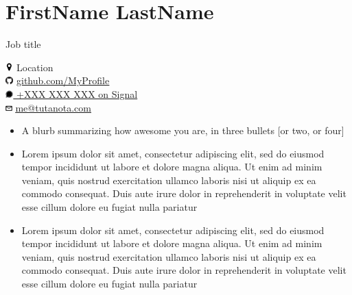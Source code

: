 \documentclass[12pt]{article}
\begin{document}
%
%
%
%
\noindent
\begin{minipage}[t]{0.66\textwidth}
\section*{\LARGE FirstName LastName}
\begin{LARGE}
Job title\\
\end{LARGE}
\end{minipage}
\hfill
\begin{minipage}[t]{0.33\textwidth}
\includegraphics[height=0.3cm]{map} Location\\
\includegraphics[height=0.3cm]{github} \href{https://github.com/MyProfile}{\underline{github.com/MyProfile}\\
\includegraphics[height=0.3cm]{signal} +XXX XXX XXX on Signal\\ %
\includegraphics[height=0.25cm]{mail}} \href{mailto:me@tutanota.com}{\underline{me@tutanota.com}}\\
\end{minipage}
\vspace*{-0.5cm}
%
%
\begin{itemize}
    \item A blurb summarizing how awesome you are, in three bullets [or two, or four]
    \item Lorem ipsum dolor sit amet, consectetur adipiscing elit, sed do eiusmod tempor incididunt ut labore et dolore magna aliqua. Ut enim ad minim veniam, quis nostrud exercitation ullamco laboris nisi ut aliquip ex ea commodo consequat. Duis aute irure dolor in reprehenderit in voluptate velit esse cillum dolore eu fugiat nulla pariatur
    \item Lorem ipsum dolor sit amet, consectetur adipiscing elit, sed do eiusmod tempor incididunt ut labore et dolore magna aliqua. Ut enim ad minim veniam, quis nostrud exercitation ullamco laboris nisi ut aliquip ex ea commodo consequat. Duis aute irure dolor in reprehenderit in voluptate velit esse cillum dolore eu fugiat nulla pariatur
\end{itemize}
\vspace*{-0.8cm}
%
%
\end{document}
